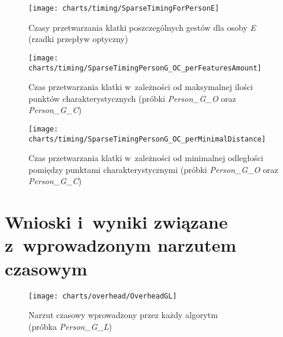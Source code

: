     \begin{figure}[!ht]
      \centering
      \texttt{[image: charts/timing/SparseTimingForPersonE]}
      \caption[Czasy przetwarzania klatki poszczególnych gestów dla osoby E\\(rzadki przepływ optyczny)]
              {Czasy przetwarzania klatki poszczególnych gestów dla osoby \textit{E}\\(rzadki przepływ optyczny)}
      \label{fig:SparseTimingForPersonE}
    \end{figure}

    \newpage
    \begin{figure}[!ht]
      \centering
      \texttt{[image: charts/timing/SparseTimingPersonG\_OC\_perFeaturesAmount]}
      \caption[Czas przetwarzania klatki w~zależności od maksymalnej ilości punktów charakterystycznych]
              {Czas przetwarzania klatki w~zależności od maksymalnej ilości punktów charakterystycznych (próbki \textit{Person\_G\_O} oraz \textit{Person\_G\_C})}
      \label{fig:TimingPerFeaturesAmount}
    \end{figure}

    \begin{figure}[!ht]
      \centering
      \texttt{[image: charts/timing/SparseTimingPersonG\_OC\_perMinimalDistance]}
      \caption[Czas przetwarzania klatki w~zależności od minimalnej odległości pomiędzy punktami charakterystycznymi]
              {Czas przetwarzania klatki w~zależności od minimalnej odległości pomiędzy punktami charakterystycznymi (próbki \textit{Person\_G\_O} oraz \textit{Person\_G\_C})}
      \label{fig:TimingPerMinimalDistance}
    \end{figure}

  \section{Wnioski i~wyniki związane z~wprowadzonym narzutem czasowym}\label{Section_Overhead}

    \begin{figure}[!ht]
      \centering
      \texttt{[image: charts/overhead/OverheadGL]}
      \caption[Narzut czasowy wprowadzony przez każdy algorytm\\(próbka Person\_G\_L)]
              {Narzut czasowy wprowadzony przez każdy algorytm\\(próbka \textit{Person\_G\_L})}
      \label{fig:OverheadGL}
    \end{figure}

